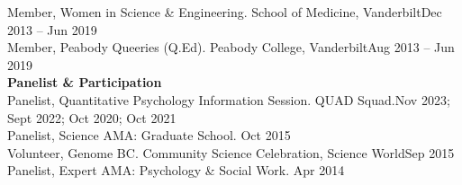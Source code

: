Member, Women in Science \& Engineering. School of Medicine, Vanderbilt\hfill{Dec 2013 – Jun 2019}\smallskip\\
Member, Peabody Queeries (Q.Ed). Peabody College, Vanderbilt\hfill{Aug 2013 – Jun 2019}\medskip\\
{\large \textbf{Panelist \& Participation}}\\
Panelist, Quantitative Psychology Information Session. QUAD Squad.\hfill{Nov 2023; Sept 2022; }\newline 
\hspace*{0pt}\hfill{Oct 2020; Oct 2021}\smallskip\\
Panelist, Science AMA: Graduate School. \hfill{Oct 2015}\smallskip\\
Volunteer, Genome BC. Community Science Celebration, Science World\hfill{Sep 2015}\smallskip\\
Panelist, Expert AMA: Psychology \& Social Work. \hfill{Apr 2014}%
